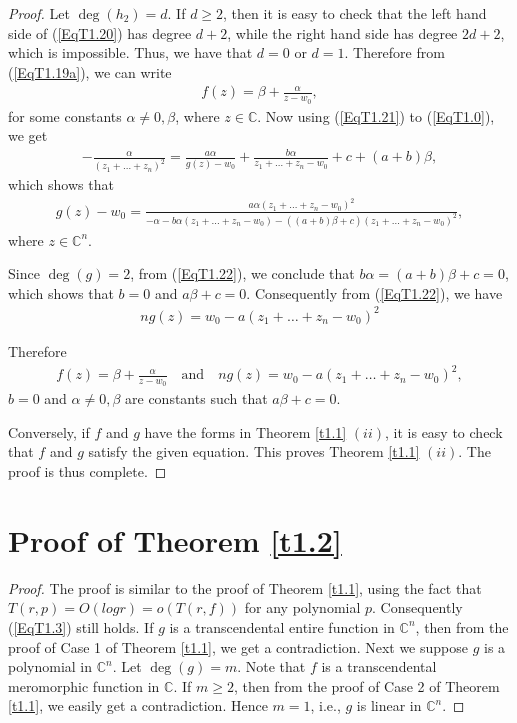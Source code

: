 \documentclass[11pt,reqno]{amsart}
\numberwithin{equation}{section}
\begin{document}
\begin{proof}
Let $\deg(h_2)=d$. If $d\geq 2$, then it is easy to check that
the left hand side of (\ref{EqT1.20}) has degree $d+2$, while the right hand side has degree $2d + 2$, which is impossible. Thus, we have that $d = 0$ or $d = 1$. Therefore from (\ref{EqT1.19a}), we can write 
\begin{align}\label{EqT1.21}
f(z)=\beta+\frac{\alpha}{z-w_0},
\end{align}
for some constants $\alpha\neq 0, \beta$, where $z\in\mathbb{C}$. Now using (\ref{EqT1.21}) to (\ref{EqT1.0}), we get 
\begin{align*}
-\frac{\alpha}{(z_1+\ldots+z_n)^2}=\frac{a\alpha}{g(z)-w_0}+\frac{b\alpha}{z_1+\ldots+z_n-w_0}+c+(a+b)\beta,
\end{align*}
which shows that
\begin{align}\label{EqT1.22}
g(z)-w_0=\frac{a\alpha(z_1+\ldots+z_n-w_0)^2}{-\alpha-b\alpha(z_1+\ldots+z_n-w_0)-((a+b)\beta+c)(z_1+\ldots+z_n-w_0)^2},
\end{align}
where $z\in\mathbb{C}^n$.

Since $\deg(g)=2$, from (\ref{EqT1.22}), we conclude that $b\alpha=(a+b)\beta+c=0$, which shows that $b=0$ and $a\beta+c=0$. 
Consequently from (\ref{EqT1.22}), we have
\begin{align*}
ng(z)=w_0-a\left(z_1+\ldots+z_n-w_0\right)^2
\end{align*}

Therefore
\begin{align*}
f(z)=\beta+\frac{\alpha}{z-w_0}\quad \text{and}\quad ng(z)=w_0-a\left(z_1+\ldots+z_n-w_0\right)^2,
\end{align*}
$b=0$ and $\alpha\neq 0, \beta$ are constants such that $a\beta+c=0$.

Conversely, if $f$ and $g$ have the forms in Theorem \ref{t1.1} $(ii)$, it is easy to check that $f$ and $g$ satisfy the given equation. This proves Theorem \ref{t1.1} $(ii)$. The proof is thus complete.
\end{proof}

\section{{Proof of Theorem \ref{t1.2}}}
\begin{proof} The proof is similar to the proof of Theorem \ref{t1.1}, using the fact that $T(r,p)= O(log r)=o(T(r,f))$ for any polynomial $p$. Consequently (\ref{EqT1.3}) still holds. If $g$ is a transcendental entire function in $\mathbb{C}^n$, then from the proof of Case 1 of Theorem \ref{t1.1}, we get a contradiction. Next we suppose $g$ is a polynomial in $\mathbb{C}^n$. Let $\deg(g)=m$. Note that $f$ is a transcendental meromorphic function in $\mathbb{C}$. If $m\geq 2$, then from the proof of Case 2 of Theorem \ref{t1.1}, we easily get a contradiction. Hence $m=1$, i.e., $g$ is linear in $\mathbb{C}^n$.
\end{proof}
\end{document}
